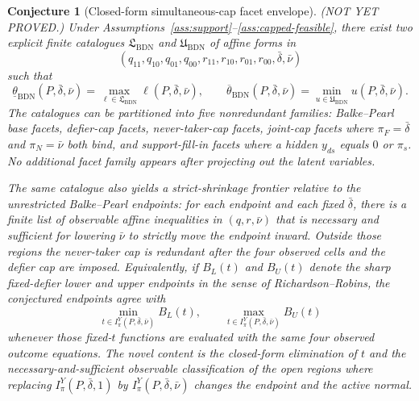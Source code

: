 \documentclass[11pt]{article}
\theoremstyle{definition}
\theoremstyle{plain}
\newtheorem{conjecture}{Conjecture}
\theoremstyle{remark}
\begin{document}
\begin{conjecture}[Closed-form simultaneous-cap facet envelope]\label{conj:facet-envelope}
(NOT YET PROVED.)  Under Assumptions~\ref{ass:support}--\ref{ass:capped-feasible}, there
exist two explicit finite catalogues
\(\mathfrak{L}_{\mathrm{BDN}}\) and \(\mathfrak{U}_{\mathrm{BDN}}\) of affine
forms in
\[
(q_{11},q_{10},q_{01},q_{00},r_{11},r_{10},r_{01},r_{00},
  \bar\delta,\bar\nu)
\]
such that
\[
\underline\theta_{\mathrm{BDN}}(P,\bar\delta,\bar\nu)
=\max_{\ell\in\mathfrak{L}_{\mathrm{BDN}}}\ell(P,\bar\delta,\bar\nu),
\qquad
\overline\theta_{\mathrm{BDN}}(P,\bar\delta,\bar\nu)
=\min_{u\in\mathfrak{U}_{\mathrm{BDN}}}u(P,\bar\delta,\bar\nu).
\]
The catalogues can be partitioned into five nonredundant families:
Balke--Pearl base facets, defier-cap facets, never-taker-cap facets,
joint-cap facets where \(\pi_F=\bar\delta\) and \(\pi_N=\bar\nu\) both bind,
and support-fill-in facets where a hidden \(y_{ds}\) equals \(0\) or \(\pi_s\).
No additional facet family appears after projecting out the latent variables.

The same catalogue also yields a strict-shrinkage frontier relative to the
unrestricted Balke--Pearl endpoints: for each endpoint and each fixed
\(\bar\delta\), there is a finite list of observable affine inequalities in
\((q,r,\bar\nu)\) that is necessary and sufficient for lowering \(\bar\nu\) to
strictly move the endpoint inward.  Outside those regions the never-taker cap
is redundant after the four observed cells and the defier cap are imposed.
Equivalently, if \(B_L(t)\) and \(B_U(t)\) denote the sharp fixed-defier lower
and upper endpoints in the sense of Richardson--Robins, the conjectured
endpoints agree with
\[
\min_{t\in I_{\pi}^{Y}(P,\bar\delta,\bar\nu)}B_L(t),
\qquad
\max_{t\in I_{\pi}^{Y}(P,\bar\delta,\bar\nu)}B_U(t)
\]
whenever those fixed-\(t\) functions are evaluated with the same four observed
outcome equations.  The novel content is the closed-form elimination of \(t\)
and the necessary-and-sufficient observable classification of the open regions
where replacing \(I_{\pi}^{Y}(P,\bar\delta,1)\) by
\(I_{\pi}^{Y}(P,\bar\delta,\bar\nu)\) changes the endpoint and the active
normal.
\end{conjecture}
\end{document}
